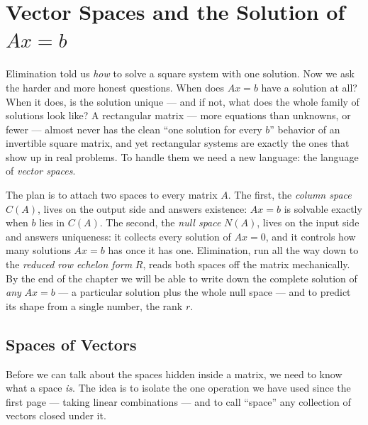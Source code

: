 \chapter{Vector Spaces and the Solution of $Ax=b$}
\label{ch:3}

Elimination told us \emph{how} to solve a square system with one solution. Now we ask the harder and more honest questions. When does $Ax=b$ have a solution at all? When it does, is the solution unique --- and if not, what does the whole family of solutions look like? A rectangular matrix --- more equations than unknowns, or fewer --- almost never has the clean ``one solution for every $b$'' behavior of an invertible square matrix, and yet rectangular systems are exactly the ones that show up in real problems. To handle them we need a new language: the language of \emph{vector spaces}.

The plan is to attach two spaces to every matrix $A$. The first, the \emph{column space} $C(A)$, lives on the output side and answers existence: $Ax=b$ is solvable exactly when $b$ lies in $C(A)$. The second, the \emph{null space} $N(A)$, lives on the input side and answers uniqueness: it collects every solution of $Ax=0$, and it controls how many solutions $Ax=b$ has once it has one. Elimination, run all the way down to the \emph{reduced row echelon form} $R$, reads both spaces off the matrix mechanically. By the end of the chapter we will be able to write down the complete solution of \emph{any} $Ax=b$ --- a particular solution plus the whole null space --- and to predict its shape from a single number, the rank $r$.

\section{Spaces of Vectors}

Before we can talk about the spaces hidden inside a matrix, we need to know what a space \emph{is}. The idea is to isolate the one operation we have used since the first page --- taking linear combinations --- and to call ``space'' any collection of vectors closed under it.


